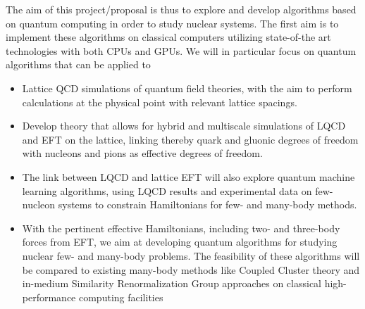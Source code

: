 \documentclass[10pt]{article}
\begin{document}
The aim of this project/proposal is thus to explore and develop
algorithms based on quantum computing in order to study nuclear
systems. The first aim is to implement these algorithms on classical
computers utilizing state-of-the art technologies with both CPUs and
GPUs. We will in particular focus on quantum algorithms that can be
applied to

\begin{itemize}
\item Lattice QCD simulations of quantum field theories, with the aim to perform calculations at the physical point with relevant lattice spacings. 
\item Develop theory that allows for hybrid and multiscale simulations of LQCD and EFT on the lattice, linking thereby quark and gluonic degrees of freedom with nucleons and pions as effective degrees of freedom.
\item The link between LQCD and lattice EFT will also explore quantum machine learning algorithms, using LQCD results and experimental data on few-nucleon systems to constrain Hamiltonians for few- and many-body methods. 
\item With the pertinent effective Hamiltonians, including two- and three-body forces from EFT, we aim at developing quantum algorithms for studying nuclear few- and many-body problems. The feasibility of these algorithms will be compared to existing many-body methods like Coupled Cluster theory and in-medium Similarity Renormalization Group approaches on classical high-performance computing facilities 
\end{itemize}
\end{document}
